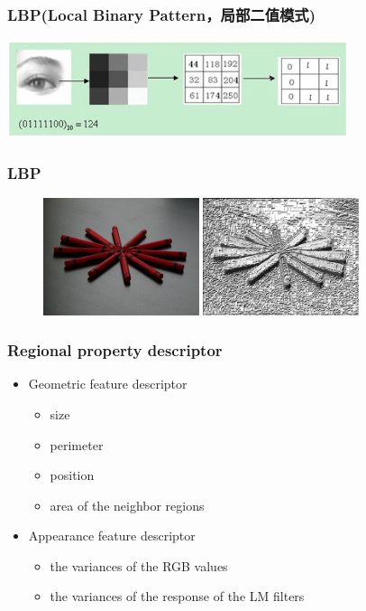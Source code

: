 \documentclass[notheorems,serif,table,compress]{beamer}  %
\begin{document}
\begin{frame}
\frametitle{LBP(Local Binary Pattern，局部二值模式)}
\centering\includegraphics[width=10cm]{LBP.png}
\end{frame}


\begin{frame}
\frametitle{LBP}
  \begin{figure}[!ht]
  \begin{minipage}[t]{0.46\textwidth}
  \includegraphics[width=1.8in]{example1.jpg}
  \end{minipage}
  \begin{minipage}[t]{0.46\textwidth}
  \includegraphics[width=1.8in]{LBP1.png}
  \end{minipage}
  \end{figure} 
\end{frame}


\begin{frame}
\frametitle{{\color{magenta}} Regional property descriptor}
\begin{itemize}
\item Geometric feature descriptor 
\begin{itemize}
\item size
\item perimeter
\item position
\item area of the neighbor regions
\end{itemize}
\item Appearance feature descriptor
\begin{itemize}
\item the variances of the RGB values
\item the variances of the response of the LM filters
\end{itemize}
\end{itemize}
\end{frame}
\end{document}
